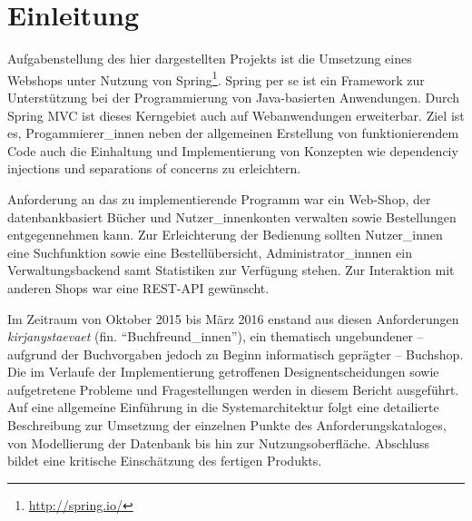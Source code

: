 \section{Einleitung}
	Aufgabenstellung des hier dargestellten Projekts ist die Umsetzung eines Webshops unter Nutzung von Spring\footnote{\hyperlink{http://spring.io/}{http://spring.io/}}. Spring per se ist ein Framework zur Unterstützung bei der Programmierung von Java-basierten Anwendungen. Durch Spring MVC ist dieses Kerngebiet auch auf Webanwendungen erweiterbar. Ziel ist es, Progammierer\_innen neben der allgemeinen Erstellung von funktionierendem Code auch die Einhaltung und Implementierung von Konzepten wie dependenciy injections und separations of concerns zu erleichtern. 
	
	Anforderung an das zu implementierende Programm war ein Web-Shop, der datenbankbasiert Bücher und Nutzer\_innenkonten verwalten sowie Bestellungen entgegennehmen kann. Zur Erleichterung der Bedienung sollten Nutzer\_innen eine Suchfunktion sowie eine Bestellübersicht, Administrator\_innnen ein Verwaltungsbackend samt Statistiken zur Verfügung stehen. Zur Interaktion mit anderen Shops war eine REST-API gewünscht.
	
	Im Zeitraum von Oktober 2015 bis März 2016 enstand aus diesen Anforderungen \textit{kirjan\-ystaevaet} (fin. "`Buchfreund\_innen"'), ein thematisch ungebundener -- aufgrund der Buchvorgaben jedoch zu Beginn informatisch geprägter -- Buchshop. Die im Verlaufe der Implementierung getroffenen Designentscheidungen sowie aufgetretene Probleme und Fragestellungen werden in diesem Bericht ausgeführt. Auf eine allgemeine Einführung in die Systemarchitektur folgt eine detailierte Beschreibung zur Umsetzung der einzelnen Punkte des Anforderungskataloges, von Modellierung der Datenbank bis hin zur Nutzungsoberfläche. Abschluss bildet eine kritische Einschätzung des fertigen Produkts. 
